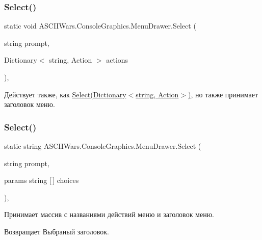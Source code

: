\subsubsection{\texorpdfstring{Select()}{Select()}\hspace{0.1cm}{\footnotesize\ttfamily [2/4]}}
{\footnotesize\ttfamily static void A\+S\+C\+I\+I\+Wars.\+Console\+Graphics.\+Menu\+Drawer.\+Select (\begin{DoxyParamCaption}\item[{string}]{prompt,  }\item[{Dictionary$<$ string, Action $>$}]{actions }\end{DoxyParamCaption})\hspace{0.3cm}{\ttfamily [inline]}, {\ttfamily [static]}}

Действует также, как \hyperlink{class_a_s_c_i_i_wars_1_1_console_graphics_1_1_menu_drawer_a2c8b1f60df7a915364bc4c0244599aa1}{Select(\+Dictionary$<$string, Action$>$)}, но также принимает заголовок меню. \hypertarget{class_a_s_c_i_i_wars_1_1_console_graphics_1_1_menu_drawer_a119f33600258dbcc040ca77f06d6c7ac}{}\label{class_a_s_c_i_i_wars_1_1_console_graphics_1_1_menu_drawer_a119f33600258dbcc040ca77f06d6c7ac} 
\subsubsection{\texorpdfstring{Select()}{Select()}\hspace{0.1cm}{\footnotesize\ttfamily [3/4]}}
{\footnotesize\ttfamily static string A\+S\+C\+I\+I\+Wars.\+Console\+Graphics.\+Menu\+Drawer.\+Select (\begin{DoxyParamCaption}\item[{string}]{prompt,  }\item[{params string \mbox{[}$\,$\mbox{]}}]{choices }\end{DoxyParamCaption})\hspace{0.3cm}{\ttfamily [inline]}, {\ttfamily [static]}}



Принимает массив с названиями действий меню и заголовок меню. 

\begin{DoxyReturn}{Возвращает}
Выбраный заголовок. 
\end{DoxyReturn}
\hypertarget{class_a_s_c_i_i_wars_1_1_console_graphics_1_1_menu_drawer_aab8b9a476227de6b8d81cb87747bdc99}{}\label{class_a_s_c_i_i_wars_1_1_console_graphics_1_1_menu_drawer_aab8b9a476227de6b8d81cb87747bdc99} 
